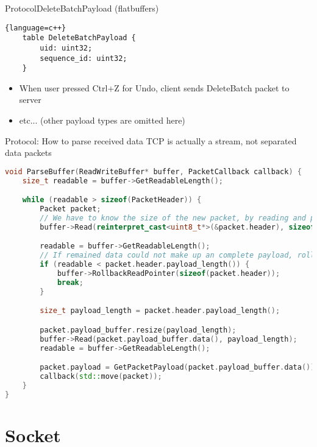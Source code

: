 \documentclass{beamer}
\begin{document}
\begin{frame}[fragile]{Protocol}{DeleteBatchPayload (flatbuffers)}
\begin{lstlisting}{language=c++}
    table DeleteBatchPayload {
        uid: uint32;
        sequence_id: uint32;
    }
\end{lstlisting}

\begin{itemize}
    \item {
        When user pressed Ctrl+Z for Undo, client sends DeleteBatch packet to server
    }
    \item {
        etc... (other payload types are omitted here)
    }
\end{itemize}
\end{frame}

\begin{frame}[fragile]{Protocol: How to parse received data}
{TCP is actually a stream, not separated data packets}
\begin{lstlisting}[language=c++,basicstyle=\ttfamily\tiny]
void ParseBuffer(ReadWriteBuffer* buffer, PacketCallback callback) {
    size_t readable = buffer->GetReadableLength();

    while (readable > sizeof(PacketHeader)) {
        Packet packet;
        // We have to know the size of the new packet, by reading and parsing the header
        buffer->Read(reinterpret_cast<uint8_t*>(&packet.header), sizeof(packet.header));

        readable = buffer->GetReadableLength();
        // If remained data could not make up an complete payload, rollback and wait for next
        if (readable < packet.header.payload_length()) {
            buffer->RollbackReadPointer(sizeof(packet.header));
            break;
        }

        size_t payload_length = packet.header.payload_length();

        packet.payload_buffer.resize(payload_length);
        buffer->Read(packet.payload_buffer.data(), payload_length);
        readable = buffer->GetReadableLength();

        packet.payload = GetPacketPayload(packet.payload_buffer.data());
        callback(std::move(packet));
    }
}
\end{lstlisting}

\end{frame}


\section{Socket}
\end{document}

